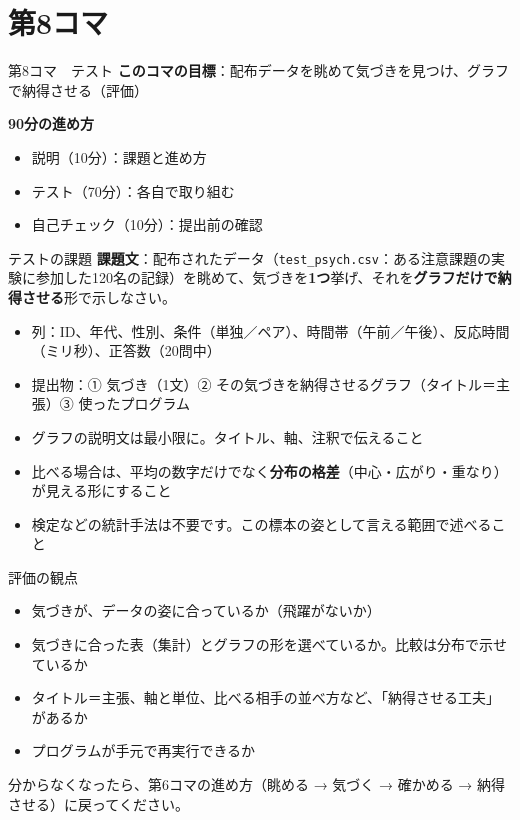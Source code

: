 \documentclass[aspectratio=169,11pt]{beamer}
\newcommand{\sess}[3]{%
\begin{frame}{#1}
\textbf{このコマの目標}：#2

\vspace{0.6em}
\textbf{90分の進め方}
\begin{itemize}
#3
\end{itemize}
\end{frame}}
\begin{document}
\section{第8コマ}
\sess{第8コマ　テスト}{配布データを眺めて気づきを見つけ、グラフで納得させる（評価）}
{\item 説明（10分）：課題と進め方
\item テスト（70分）：各自で取り組む
\item 自己チェック（10分）：提出前の確認}

\begin{frame}{テストの課題}
\textbf{課題文}：配布されたデータ（\texttt{test\_psych.csv}：ある注意課題の実験に参加した120名の記録）を眺めて、気づきを\textbf{1つ}挙げ、それを\textbf{グラフだけで納得させる}形で示しなさい。
\begin{itemize}
\item 列：ID、年代、性別、条件（単独／ペア）、時間帯（午前／午後）、反応時間（ミリ秒）、正答数（20問中）
\item 提出物：① 気づき（1文）② その気づきを納得させるグラフ（タイトル＝主張）③ 使ったプログラム
\item グラフの説明文は最小限に。タイトル、軸、注釈で伝えること
\item 比べる場合は、平均の数字だけでなく\textbf{分布の格差}（中心・広がり・重なり）が見える形にすること
\item 検定などの統計手法は不要です。この標本の姿として言える範囲で述べること
\end{itemize}
\end{frame}

\begin{frame}{評価の観点}
\begin{itemize}
\item 気づきが、データの姿に合っているか（飛躍がないか）
\item 気づきに合った表（集計）とグラフの形を選べているか。比較は分布で示せているか
\item タイトル＝主張、軸と単位、比べる相手の並べ方など、「納得させる工夫」があるか
\item プログラムが手元で再実行できるか
\end{itemize}
\vspace{0.5em}
分からなくなったら、第6コマの進め方（眺める → 気づく → 確かめる → 納得させる）に戻ってください。
\end{frame}
\end{document}
